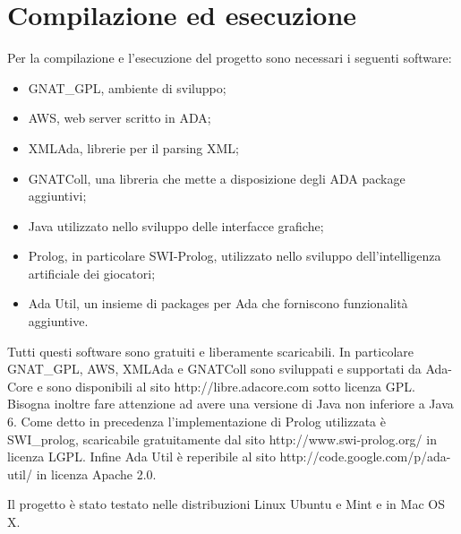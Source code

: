 
\section{Compilazione ed esecuzione}
\label{sec:compilazione_esecuzione}

Per la compilazione e l'esecuzione del progetto sono necessari i seguenti software:\\

\begin{itemize}
	\item GNAT\_GPL, ambiente di sviluppo;
	\item AWS, web server scritto in ADA;
	\item XMLAda, librerie per il parsing XML;
	\item GNATColl, una libreria che mette a disposizione degli ADA package aggiuntivi; 
	\item Java utilizzato nello sviluppo delle interfacce grafiche;
	\item Prolog, in particolare SWI-Prolog, utilizzato nello sviluppo dell'intelligenza artificiale dei giocatori;
	\item Ada Util, un insieme di packages per Ada che forniscono funzionalit\`{a} aggiuntive.
\end{itemize}

\noindent Tutti questi software sono gratuiti e liberamente scaricabili. In particolare GNAT\_GPL, AWS, XMLAda e GNATColl sono sviluppati e supportati da Ada-Core e sono disponibili al sito http://libre.adacore.com sotto licenza GPL. Bisogna inoltre fare attenzione ad avere una versione di Java non inferiore a Java 6. Come detto in precedenza l'implementazione di Prolog utilizzata \`{e} SWI\_prolog, scaricabile gratuitamente dal sito http://www.swi-prolog.org/ in licenza LGPL. Infine Ada Util \`{e} reperibile al sito http://code.google.com/p/ada-util/ in licenza Apache 2.0. 

Il progetto \`{e} stato testato nelle distribuzioni Linux Ubuntu e Mint e in Mac OS X.

